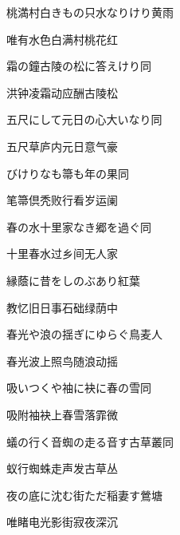 \begin{haiku}
    {\FH 桃満村白きもの只水なりけり}\hfill{\FH 黄雨}

    {\FK 唯有水色白满村桃花红}
\end{haiku}

\begin{haiku}
    {\FH 霜の鐘古陵の松に答えけり}\hfill{\FH 同}

    {\FK 洪钟凌霜动应酬古陵松}
\end{haiku}

\begin{haiku}
    {\FH {}五尺にして元日の心大いなり}\hfill{\FH 同}

    {\FK 五尺草庐内元日意气豪}
\end{haiku}

\begin{haiku}
    {\FH {}びけりなも箒も年の果}\hfill{\FH 同}

    {\FK 笔箒倶秃败行看岁运阑}
\end{haiku}

\begin{haiku}
    {\FH 春の水十里家なき郷を過ぐ}\hfill{\FH 同}

    {\FK 十里春水过乡间无人家}
\end{haiku}

\begin{haiku}
    {\FH 縁蔭に昔をしのぶあり}\hfill{\FH 紅葉}

    {\FK 教忆旧日事石础绿荫中}
\end{haiku}

\begin{haiku}
    {\FH 春光や浪の揺ぎにゆらぐ鳥}\hfill{\FH 麦人}

    {\FK 春光波上照鸟随浪动摇}
\end{haiku}

\begin{haiku}
    {\FH 吸いつくや袖に袂に春の雪}\hfill{\FH 同}

    {\FK 吸附袖袂上春雪落霏微}
\end{haiku}

\begin{haiku}
    {\FH 蟻の行く音蜘の走る音す古草叢}\hfill{\FH 同}

    {\FK 蚁行蜘蛛走声发古草丛}
\end{haiku}

\begin{haiku}
    {\FH 夜の底に沈む街ただ稲妻す}\hfill{\FH 鶯塘}

    {\FK 唯睹电光影街寂夜深沉}
\end{haiku}

